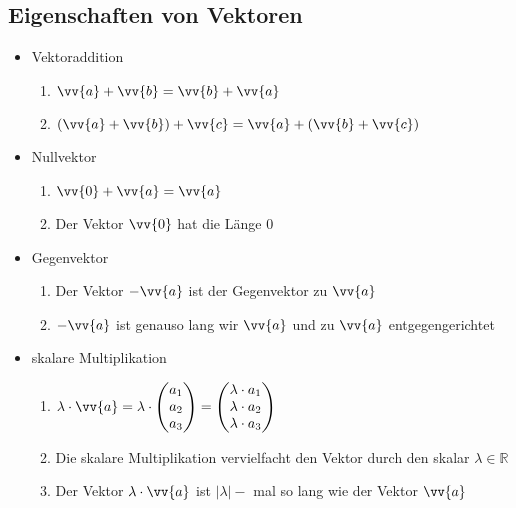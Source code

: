 \documentclass[a4paper,twocolumn,10pt]{onepgnote1}
\begin{document}
\subsection{Eigenschaften von Vektoren}
\begin{itemize}
\item Vektoraddition\\
\begin{enumerate}
\item $\vv{a} +\vv{b} = \vv{b} + \vv{a}$\\
\item $\left( \vv{a}+\vv{b}\right)+\vv{c} = \vv{a} +\left(\vv{b} +\vv{c}\right)$
\end{enumerate}
\item Nullvektor\\
\begin{enumerate}
\item $\vv{0} +\vv{a} = \vv{a}$ \item Der Vektor $\vv{0}$ hat die Länge $0$
\end{enumerate}
\item Gegenvektor\\
\begin{enumerate}
\item Der Vektor $-\vv{a}$ ist der Gegenvektor zu $\vv{a}$\\
\item $-\vv{a}$ ist genauso lang wir $\vv{a}$ und  zu $\vv{a}$ entgegengerichtet
\end{enumerate}
\item skalare Multiplikation\\
\begin{enumerate}
\item $\lambda \cdot \vv{a} = \lambda \cdot \begin{pmatrix} a_1 \\ a_2 \\ a_3 \end{pmatrix} = \begin{pmatrix} \lambda \cdot a_1 \\ \lambda \cdot a_2 \\ \lambda \cdot a_3 \end{pmatrix}$\\
\item Die skalare Multiplikation vervielfacht den Vektor durch den skalar $\lambda \in \mathds{R}$\\
\item Der Vektor $\lambda\cdot \vv{a}$ ist $| \lambda |-$ mal so lang wie der Vektor $\vv{a}$\\

\end{enumerate}
\end{itemize}
\end{document}
